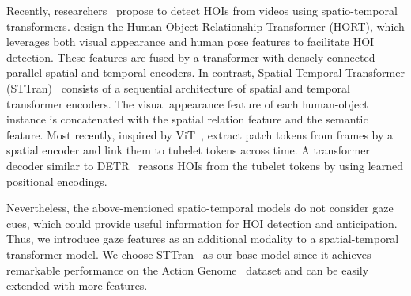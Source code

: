 \documentclass[times,twocolumn,final,authoryear]{elsarticle}
\begin{document}
Recently, researchers~\citep{hoi_v2:detecting_hort, hoi_v2:sttran, hoi_v2:tubelet_tokens} propose to detect HOIs from videos using spatio-temporal transformers. \citet{hoi_v2:detecting_hort} design the Human-Object Relationship Transformer (HORT), which leverages both visual appearance and human pose features to facilitate HOI detection. These features are fused by a transformer with densely-connected parallel spatial and temporal encoders. In contrast, Spatial-Temporal Transformer (STTran)~\citep{hoi_v2:sttran} consists of a sequential architecture of spatial and temporal transformer encoders. The visual appearance feature of each human-object instance is concatenated with the spatial relation feature and the semantic feature. Most recently, inspired by ViT~\citep{transformer:vit}, \citet{hoi_v2:tubelet_tokens} extract patch tokens from frames by a spatial encoder and link them to tubelet tokens across time. A transformer decoder similar to DETR~\citep{detection:detr} reasons HOIs from the tubelet tokens by using learned positional encodings.

Nevertheless, the above-mentioned spatio-temporal models do not consider gaze cues, which could provide useful information for HOI detection and anticipation. Thus, we introduce gaze features as an additional modality to a spatial-temporal transformer model. We choose STTran~\citep{hoi_v2:sttran} as our base model since it achieves remarkable performance on the Action Genome~\citep{hoi_v_set:action_genome} dataset and can be easily extended with more features.
\end{document}
